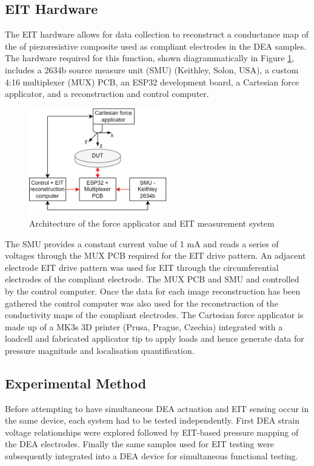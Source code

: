 \subsection{EIT Hardware}
\label{subsec:eit_hw}
The EIT hardware allows for data collection to reconstruct a conductance map of the of piezoresistive composite used as compliant electrodes in the DEA samples. The hardware required for this function, shown diagrammatically in Figure \ref{fig:ERT_MUX_CFA}, includes a 2634b source measure unit (SMU) (Keithley, Solon, USA), a custom 4:16 multiplexer (MUX) PCB, an ESP32 development board, a Cartesian force applicator, and a reconstruction and control computer. 
\begin{figure}[H]
	\centering
	\includegraphics[width=6cm]{Figures/ERT_MUX_CFA_architecture.jpg}
	\vspace{0.2cm}
	\caption{Architecture of the force applicator and EIT measurement system \cite{Ellingham2024}}
	\label{fig:ERT_MUX_CFA}
\end{figure}
The SMU provides a constant current value of 1 mA and reads a series of voltages through the MUX PCB required for the EIT drive pattern. An adjacent electrode EIT drive pattern was used for EIT through the circumferential electrodes of the compliant electrode. The MUX PCB and SMU and controlled by the control computer. Once the data for each image reconstruction has been gathered the control computer was also used for the reconstruction of the conductivity maps of the compliant electrodes. The Cartesian force applicator is made up of a MK3s 3D printer (Prusa, Prague, Czechia) integrated with a loadcell and fabricated applicator tip to apply loads and hence generate data for pressure magnitude and localisation quantification.


\subsection{Experimental Method}
\label{subsec:experimental_method}
Before attempting to have simultaneous DEA actuation and EIT sensing occur in the same device, each system had to be tested independently. First DEA strain voltage relationships were explored followed by EIT-based pressure mapping of the DEA electrodes. Finally the same samples used for EIT testing were subsequently integrated into a DEA device for simultaneous functional testing.

